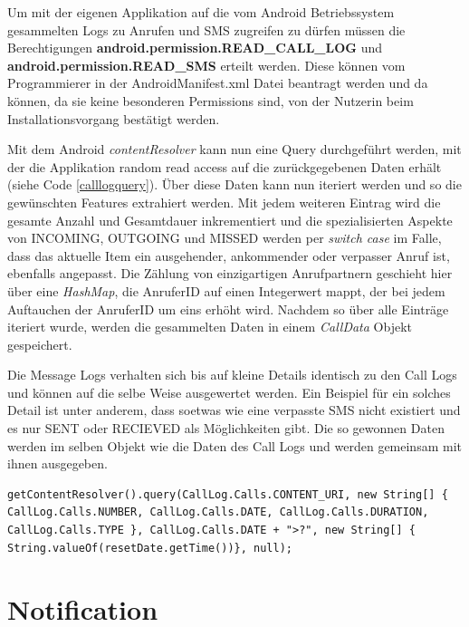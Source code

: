 Um mit der eigenen Applikation auf die vom Android Betriebssystem gesammelten Logs zu Anrufen und SMS zugreifen zu dürfen müssen die Berechtigungen 
\textbf{android.permission.READ\_CALL\_LOG} und \textbf{android.permission.READ\_SMS} erteilt werden.
Diese können vom Programmierer in der AndroidManifest.xml Datei beantragt werden und da können, da sie keine besonderen Permissions sind,
von der Nutzerin beim Installationsvorgang bestätigt werden.
\par
Mit dem Android \emph{contentResolver} kann nun eine Query durchgeführt werden, mit der die Applikation random read access auf die zurückgegebenen Daten erhält (siehe Code \ref{calllogquery}).
Über diese Daten kann nun iteriert werden und so die gewünschten Features extrahiert werden.
Mit jedem weiteren Eintrag wird die gesamte Anzahl und Gesamtdauer inkrementiert und die spezialisierten Aspekte von INCOMING, OUTGOING und MISSED werden per \emph{switch case} im Falle, dass das aktuelle Item ein ausgehender, ankommender oder verpasser Anruf ist, ebenfalls angepasst.
Die Zählung von einzigartigen Anrufpartnern geschieht hier über eine \emph{HashMap}, die AnruferID auf einen Integerwert mappt, der bei jedem Auftauchen der AnruferID um eins erhöht wird.
Nachdem so über alle Einträge iteriert wurde, werden die gesammelten Daten in einem \emph{CallData} Objekt gespeichert.
\par

Die Message Logs verhalten sich bis auf kleine Details identisch zu den Call Logs und können auf die selbe Weise ausgewertet werden.
Ein Beispiel für ein solches Detail ist unter anderem, dass soetwas wie eine verpasste SMS nicht existiert und es nur SENT oder RECIEVED als Möglichkeiten gibt.
Die so gewonnen Daten werden im selben Objekt wie die Daten des Call Logs und werden gemeinsam mit ihnen ausgegeben.

\begin{lstlisting}[frame=single, caption = Call Log Query, label=calllogquery] 
  getContentResolver().query(CallLog.Calls.CONTENT_URI, new String[] { CallLog.Calls.NUMBER, CallLog.Calls.DATE, CallLog.Calls.DURATION, CallLog.Calls.TYPE }, CallLog.Calls.DATE + ">?", new String[] { String.valueOf(resetDate.getTime())}, null);
\end{lstlisting}

\section{Notification}

